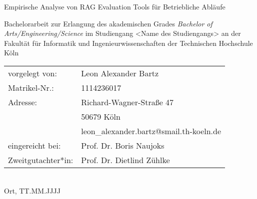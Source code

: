 \begin{titlepage}
%
\sffamily%
%
\begin{center}
\end{center}
%
\vfill
%
\begin{huge}
Empirische Analyse von RAG Evaluation Tools für Betriebliche Abläufe\\[10mm]
\end{huge}
%
Bachelorarbeit zur Erlangung des akademischen Grades\newline
\emph{Bachelor of Arts/Engineering/Science}\newline
im Studiengang <Name des Studiengangs>\newline
an der Fakultät für Informatik und Ingenieurwissenschaften\newline
der Technischen Hochschule Köln
%
\vfill
%
\begin{tabular}{@{}ll}
vorgelegt von: & Leon Alexander Bartz\\
Matrikel-Nr.:  & 1114236017\\
Adresse:       & Richard-Wagner-Straße 47\\
               & 50679 Köln\\
               & leon_alexander.bartz@smail.th-koeln.de\\[5mm]
eingereicht bei:   & Prof. Dr. Boris Naujoks\\
Zweitgutachter*in: & Prof. Dr. Dietlind Zühlke
\end{tabular}	
%
\\[10mm]
%
Ort, TT.MM.JJJJ%
%
\rmfamily%
%
\end{titlepage}